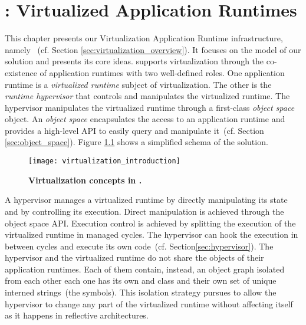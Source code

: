 

\chapter{\VTT: Virtualized Application Runtimes}
\minitoc
\introduction

This chapter presents our Virtualization Application Runtime infrastructure, namely \VTT~(cf. Section \ref{sec:virtualization_overview}). It focuses on the model of our solution and presents its core ideas. \VTT supports virtualization through the co-existence of application runtimes with two well-defined roles. One application runtime is a \emph{virtualized runtime} subject of virtualization. The other is the \emph{runtime hypervisor} that controls and manipulates the virtualized runtime.
The hypervisor manipulates the virtualized runtime through a first-class \emph{object space} object. An \emph{object space} encapsulates the access to an application runtime and provides a high-level API to easily query and manipulate it~(cf. Section \ref{sec:object_space}). Figure \ref{fig:virtualization_introduction} shows a simplified schema of the solution.

\begin{figure}[htb]
\begin{center}
\texttt{[image: virtualization\_introduction]}
\caption{\textbf{Virtualization concepts in \Vtt.}\label{fig:virtualization_introduction}}
\end{center}
\end{figure}

A hypervisor manages a virtualized runtime by directly manipulating its state and by controlling its execution. Direct manipulation is achieved through the object space API. Execution control is achieved by splitting the execution of the virtualized runtime in managed cycles. The hypervisor can hook the execution in between cycles and execute its own code~(cf. Section\ref{sec:hypervisor}).
The hypervisor and the virtualized runtime do not share the objects of their application runtimes. Each of them contain, instead, an object graph isolated from each other \eg each one has its own  and  class and their own set of unique interned strings~(the symbols). This isolation strategy pursues to allow the hypervisor to change any part of the virtualized runtime without affecting itself as it happens in reflective architectures.

